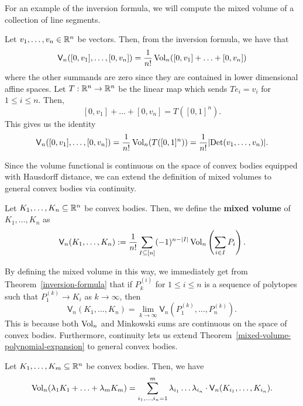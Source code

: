 \documentclass{puthesis-UG}
\begin{document}
For an example of the inversion formula, we will compute the mixed volume of a collection of line segments.

\begin{example}\label{mixed-volume-of-line-segments}
	Let $v_1, \ldots, v_n \in \mathbb{R}^n$ be vectors. Then, from the inversion formula, we have that 
	\begin{align*}
		\mathsf{V}_n([0, v_1], \ldots, [0, v_n]) = \frac{1}{n!} \operatorname{Vol}_n ([0, v_1] + \ldots + [0, v_n])
	\end{align*}
	where the other summands are zero since they are contained in lower dimensional affine spaces. Let $T : \mathbb{R}^n \to \mathbb{R}^n$ be the linear map which sends $Te_i = v_i$ for $1 \leq i \leq n$. Then, 
	\[
		[0, v_1] + \ldots + [0, v_n] = T ([0, 1]^n).
	\]
	This gives us the identity 
	\[
		\mathsf{V}_n([0, v_1], \ldots, [0, v_n]) = \frac{1}{n!} \operatorname{Vol}_n(T([0, 1]^n)) = \frac{1}{n!} |\text{Det}(v_1, \ldots, v_n)|.
	\]
\end{example}

Since the volume functional is continuous on the space of convex bodies equipped with Hausdorff distance, we can extend the definition of mixed volumes to general convex bodies via continuity. 

\begin{defn}
	Let $K_1, \ldots, K_n \subseteq \mathbb{R}^n$ be convex bodies. Then, we define the \textbf{mixed volume} of $K_1, \ldots, K_n$ as  
	\[
		\mathsf{V}_{n}(K_1, \ldots, K_n) := \frac{1}{n!} \sum_{I \subseteq [n]} (-1)^{n- |I|} \operatorname{Vol}_n \left ( \sum_{i \in I} P_i \right ).
	\]
\end{defn}

By defining the mixed volume in this way, we immediately get from Theorem~\ref{inversion-formula} that if $P^{(i)}_k$ for $1 \leq i \leq n$ is a sequence of polytopes such that $P_1^{(k)} \longrightarrow K_i$ as $k \to \infty$, then 
\[
	\mathsf{V}_n(K_1, \ldots, K_n) = \lim_{k \to \infty} \mathsf{V}_n (P_1^{(k)}, \ldots, P_n^{(k)}).
\] 
This is because both $\operatorname{Vol}_n$ and Minkowski sums are continuous on the space of convex bodies. Furthermore, continuity lets us extend Theorem~\ref{mixed-volume-polynomial-expansion} to general convex bodies. 
\begin{thm} \label{mixed-volume-polynomial-expansion-FINAL}
	Let $K_1, \ldots, K_m \subseteq \mathbb{R}^n$ be convex bodies. Then, we have 
	\[
		\operatorname{Vol}_n (\lambda_1 K_1 + \ldots + \lambda_m K_m) = \sum_{i_1 , \ldots , i_n = 1}^m \lambda_{i_1} \ldots \lambda_{i_n} \cdot \mathsf{V}_n (K_{i_1}, \ldots, K_{i_n}).
	\]
\end{thm}
\end{document}
